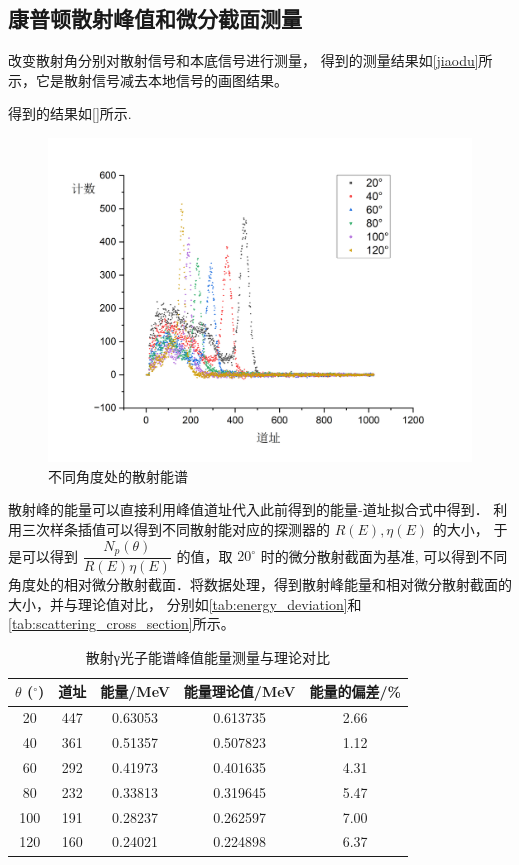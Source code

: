 \documentclass[font=default]{mpltx}
\begin{document}
    \subsection{康普顿散射峰值和微分截面测量}

    改变散射角分别对散射信号和本底信号进行测量， 得到的测量结果如\autoref{jiaodu}所示，它是散射信号减去本地信号的画图结果。
    
    得到的结果如\autoref{}所示.

      \begin{figure}[htbp]
        \centering
        \includegraphics[width=0.85\linewidth]{fig/jiaodu.png}
        \caption{不同角度处的散射能谱}
        \label{fig:jiaodu}
      \end{figure}
      散射峰的能量可以直接利用峰值道址代入此前得到的能量-道址拟合式中得到．
      利用三次样条插值可以得到不同散射能对应的探测器的 $R(E), \eta(E)$ 的大小，
      于是可以得到 $\dfrac{N_p(\theta)}{R(E)\eta(E)}$ 的值，取 $20^\circ$ 时的微分散射截面为基准,
      可以得到不同角度处的相对微分散射截面．将数据处理，得到散射峰能量和相对微分散射截面的大小，并与理论值对比，
      分别如\autoref{tab:energy_deviation}和\autoref{tab:scattering_cross_section}所示。

      \begin{table}[htbp]
        \centering
        \caption{散射γ光子能谱峰值能量测量与理论对比}
        \begin{tabular}{ccccc}
          \toprule
          $\theta$ ($^\circ$) & 道址 & 能量/MeV & 能量理论值/MeV & 能量的偏差/\% \\
          \midrule
          20 & 447 & 0.63053 & 0.613735 & 2.66 \\
          40 & 361 & 0.51357 & 0.507823 & 1.12 \\
          60 & 292 & 0.41973 & 0.401635 & 4.31 \\
          80 & 232 & 0.33813 & 0.319645 & 5.47 \\
          100 & 191 & 0.28237 & 0.262597 & 7.00 \\
          120 & 160 & 0.24021 & 0.224898 & 6.37 \\
          \bottomrule
        \end{tabular}
        \label{tab:energy_deviation}
      \end{table}
\end{document}
